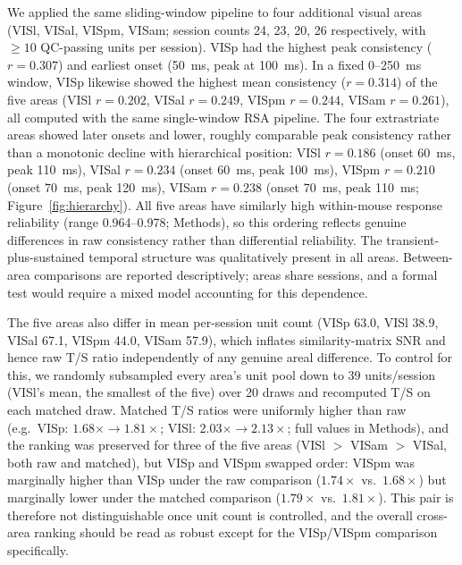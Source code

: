 \documentclass[11pt,onecolumn]{article}
\begin{document}
We applied the same sliding-window pipeline to four additional visual
areas (VISl, VISal, VISpm, VISam; session counts 24, 23, 20, 26
respectively, with $\geq 10$ QC-passing units per session).  VISp had the
highest peak consistency ($r = 0.307$) and earliest onset (50~ms, peak at
100~ms).  In a fixed 0--250~ms window, VISp likewise showed the highest
mean consistency ($r = 0.314$) of the five areas (VISl $r = 0.202$,
VISal $r = 0.249$, VISpm $r = 0.244$, VISam $r = 0.261$), all computed
with the same single-window RSA pipeline.  The four extrastriate areas
showed later onsets and lower, roughly comparable peak consistency rather
than a monotonic decline with hierarchical position: VISl $r = 0.186$
(onset 60~ms, peak 110~ms), VISal $r = 0.234$ (onset 60~ms, peak 100~ms),
VISpm $r = 0.210$ (onset 70~ms, peak 120~ms), VISam $r = 0.238$
(onset 70~ms, peak 110~ms; Figure~\ref{fig:hierarchy}).  All five areas
have similarly high within-mouse response reliability (range
0.964--0.978; Methods), so this ordering reflects genuine differences in
raw consistency rather than differential reliability.  The
transient-plus-sustained temporal structure was qualitatively present in
all areas.  Between-area comparisons are reported descriptively; areas
share sessions, and a formal test would require a mixed model accounting
for this dependence.

The five areas also differ in mean per-session unit count (VISp 63.0,
VISl 38.9, VISal 67.1, VISpm 44.0, VISam 57.9), which inflates
similarity-matrix SNR and hence raw T/S ratio independently of any
genuine areal difference.  To control for this, we randomly subsampled
every area's unit pool down to 39 units/session (VISl's mean, the
smallest of the five) over 20 draws and recomputed T/S on each matched
draw.  Matched T/S ratios were uniformly higher than raw (e.g.\ VISp:
$1.68\times \to 1.81\times$; VISl: $2.03\times \to 2.13\times$; full
values in Methods), and the ranking was preserved for three of the five
areas (VISl $>$ VISam $>$ VISal, both raw and matched), but VISp and
VISpm swapped order: VISpm was marginally higher than VISp under the raw
comparison ($1.74\times$ vs.\ $1.68\times$) but marginally lower under
the matched comparison ($1.79\times$ vs.\ $1.81\times$).  This pair is
therefore not distinguishable once unit count is controlled, and the
overall cross-area ranking should be read as robust except for the
VISp/VISpm comparison specifically.
\end{document}
